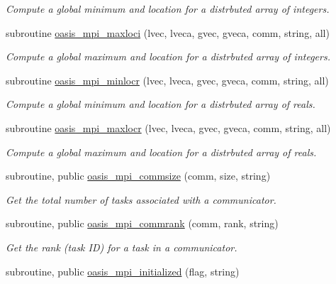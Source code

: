 \begin{DoxyCompactItemize}
\begin{DoxyCompactList}\small\item\em Compute a global minimum and location for a distrbuted array of integers. \end{DoxyCompactList}\item 
subroutine \hyperlink{namespacemod__oasis__mpi_a103579b46cc544dc29fb6643bf23237c}{oasis\+\_\+mpi\+\_\+maxloci} (lvec, lveca, gvec, gveca, comm, string, all)
\begin{DoxyCompactList}\small\item\em Compute a global maximum and location for a distrbuted array of integers. \end{DoxyCompactList}\item 
subroutine \hyperlink{namespacemod__oasis__mpi_a6808017043f4531bf0d470b25bdff94b}{oasis\+\_\+mpi\+\_\+minlocr} (lvec, lveca, gvec, gveca, comm, string, all)
\begin{DoxyCompactList}\small\item\em Compute a global minimum and location for a distrbuted array of reals. \end{DoxyCompactList}\item 
subroutine \hyperlink{namespacemod__oasis__mpi_a915aaf2f2d17f9108e8d08c2e4976e49}{oasis\+\_\+mpi\+\_\+maxlocr} (lvec, lveca, gvec, gveca, comm, string, all)
\begin{DoxyCompactList}\small\item\em Compute a global maximum and location for a distrbuted array of reals. \end{DoxyCompactList}\item 
subroutine, public \hyperlink{namespacemod__oasis__mpi_adac784196d7af85611752214137dd4db}{oasis\+\_\+mpi\+\_\+commsize} (comm, size, string)
\begin{DoxyCompactList}\small\item\em Get the total number of tasks associated with a communicator. \end{DoxyCompactList}\item 
subroutine, public \hyperlink{namespacemod__oasis__mpi_a2690a841a331f4398cc4b5a244bbc52e}{oasis\+\_\+mpi\+\_\+commrank} (comm, rank, string)
\begin{DoxyCompactList}\small\item\em Get the rank (task ID) for a task in a communicator. \end{DoxyCompactList}\item 
subroutine, public \hyperlink{namespacemod__oasis__mpi_a384f170e63ac03f25d3bd549245b43f3}{oasis\+\_\+mpi\+\_\+initialized} (flag, string)

\end{DoxyCompactItemize}
